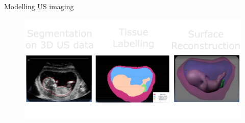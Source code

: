 

{


\begin{frame}{Modelling US imaging}
      \begin{figure}
        \centering
        \includegraphics[width=1.0\textwidthfigures]{./figures/modelling-us-imaging/versions/drawing-v02.png}
      \end{figure}
\end{frame}
}



